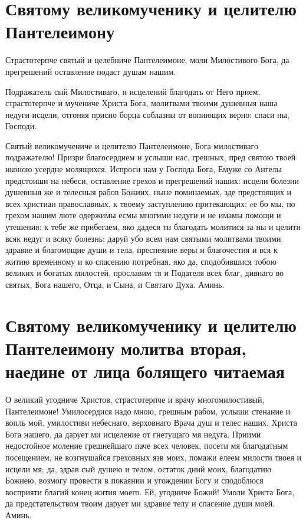 \section{Святому великомученику и целителю Пантелеимону}\begin{mymulticols}



Страстотерпче святый и целебниче Пантелеимоне, моли Милостивого Бога, да прегрешений оставление подаст душам нашим.


Подражатель сый Милостиваго, и исцелений благодать от Него прием, страстотерпче и мучениче Христа Бога, молитвами твоими душевныя наша недуги исцели, отгоняя присно борца соблазны от вопиющих верно: спаси ны, Господи.


Святый великомучениче и целителю Пантелеимоне, Бога милостиваго подражателю! Призри благосердием и услыши нас, грешных, пред святою твоей иконою усердне молящихся. Испроси нам у Господа Бога, Емуже со Ангелы предстоиши на небеси, оставление грехов и прегрешений наших: исцели болезни душевныя же и телесныя рабов Божиих, ныне поминаемых, зде предстоящих и всех христиан православных, к твоему заступлению притекающих: cе бо мы, по грехом нашим люте одержимы есмы многими недуги и не имамы помощи и утешения: к тебе же прибегаем, яко дадеся ти благодать молитися за ны и целити всяк недуг и всяку болезнь; даруй убо всем нам святыми молитвами твоими здравие и благомощие души и тела, преспеяние веры и благочестия и вся к житию временному и ко спасению потребная, яко да, сподобившися тобою великих и богатых милостей, прославим тя и Подателя всех благ, дивнаго во святых, Бога нашего, Отца, и Сына, и Святаго Духа. Аминь.

\end{mymulticols}

\section{Святому великомученику и целителю Пантелеимону молитва вторая, наедине от лица болящего читаемая}\begin{mymulticols}

О великий угодниче Христов, страстотерпче и врачу многомилостивый, Пантелеимоне! Умилосердися надо мною, грешным рабом, услыши стенание и вопль мой, умилостиви небеснаго, верховнаго Врача душ и телес наших, Христа Бога нашего, да дарует ми исцеление от гнетущаго мя недуга. Приими недостойное моление грешнейшаго паче всех человек, посети мя благодатным посещением, не возгнушайся греховных язв моих, помажи елеем милости твоея и исцели мя; да, здрав сый душею и телом, остаток дний моих, благодатию Божиею, возмогу провести в покаянии и угождении Богу и сподоблюся восприяти благий конец жития моего. Ей, угодниче Божий! Умоли Христа Бога, да предстательством твоим дарует ми здравие телу и спасение души моей. Аминь.

\end{mymulticols}

